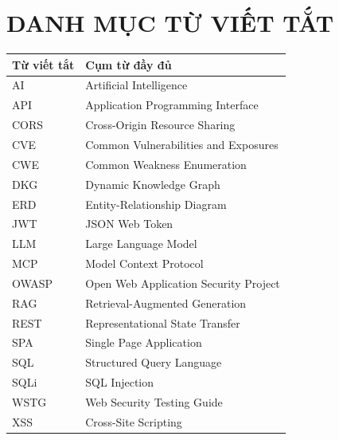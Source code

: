\chapter*{\centering\Large{DANH MỤC TỪ VIẾT TẮT}}

\begin{table}[h]
\centering
\renewcommand{\arraystretch}{1.5}
\begin{tabular}{| p{} |p{} |}
\hline
\textbf{Từ viết tắt} & \textbf{Cụm từ đầy đủ} \\
\hline
AI & Artificial Intelligence \\
\hline
API & Application Programming Interface \\
\hline
CORS & Cross-Origin Resource Sharing \\
\hline
CVE & Common Vulnerabilities and Exposures \\
\hline
CWE & Common Weakness Enumeration \\
\hline
DKG & Dynamic Knowledge Graph \\
\hline
ERD & Entity-Relationship Diagram \\
\hline
JWT & JSON Web Token \\
\hline
LLM & Large Language Model \\
\hline
MCP & Model Context Protocol \\
\hline
OWASP & Open Web Application Security Project \\
\hline
RAG & Retrieval-Augmented Generation \\
\hline
REST & Representational State Transfer \\
\hline
SPA & Single Page Application \\
\hline
SQL & Structured Query Language \\
\hline
SQLi & SQL Injection \\
\hline
WSTG & Web Security Testing Guide \\
\hline
XSS & Cross-Site Scripting \\
\hline
\end{tabular}
\end{table}
